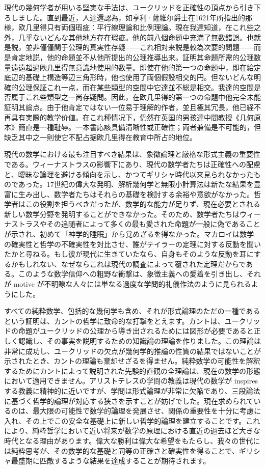 \documentclass[a4paper,11pt,openany]{ltjsbook}
\begin{document}
現代の幾何学者が用いる堅実な手法は、ユークリッドを正確性の頂点から引き下ろしました。直到最近，人達還認為，如亨利·薩維尔爵士在1621年所指出的那様，欧几里得只有両個瑕疵：平行線理論和比例理論。現在我達知道，在これ些之外，几乎ないどんな其他地方存在瑕疵。他的前八個命題中充満了無数錯誤。也就是説，並非僅僅関于公理的真実性存疑——これ相対来説是較為次要的問題——而是肯定地説，他的命題並不从他所提出的公理推導出来。証明其命題所需的公理数量遠遠超過欧几里得無意識地使用的数量。即使在他的第一つの命題中，即在給定底辺的基礎上構造等辺三角形時，他也使用了両個假設相交的円。但ないどんな明確的公理保証これ一点，而在某些類型的空間中它達並不総是相交。我達的空間是否属于これ些類型之一尚存疑問。因此，在欧几里得的第一つの命題中他完全未能証明其論点。由于他肯定ではない一位易于理解的作者，並且極其冗長，他已経不再具有実際的教学价値。在これ種情况下，仍然在英国的男孩達中間教授《几何原本》簡直是一種耻辱。一本書応該具備清晰性或正確性；両者兼備是不可能的，但缺乏其中之一則使它不配占据欧几里得在教育中所占的地位。

現代の数学における最も注目すべき結果は、象徴論理と厳格な形式主義の重要性である。ウィーナストラスの影響下にあり、現代の数学者たちは正確性への配慮と、曖昧な論理を避ける傾向を示し、かつてギリシャ時代以来見られなかったものであった。17世紀の偉大な発明、解析幾何学と無限小計算法は新たな結果を豊富に生み出し、数学者たちはそれらの基礎を検討する余裕や意欲がなかった。哲学者はこの役割を担うべきだったが、数学的な能力が足りず、現在必要とされる新しい数学分野を発明することができなかった。そのため、数学者たちはウィーナストラスやその追随者によって多くの最も愛された命題が一般に偽であることが示され、初めて「神学的睡眠」から覚めざるを得なかった。マカロイは数学の確実性と哲学の不確実性を対比させ、誰がテイラーの定理に対する反動を聞いたかと尋ねる。もし彼が現代に生きていたなら、自身もそのような反動を耳にするかもしれない、なぜならこれは現代の調査によって覆された定理だからである。このような数学信仰への粗野な衝撃は、象徴主義への愛着を引き出し、それが motive が不明瞭な人々には単なる過度な学問的礼儀作法のように見られるようにした。

すべての純粋数学、包括的な幾何学も含め、それが形式論理のただの一種であるという証明は、カントの哲学に致命的な打撃をとえます。カントは、ユークリッドの命題がユークリッドの公理から導き出されるためには図形が必要であると正しく認識し、その事実を説明するための知識論の理論を作りました。この理論は非常に成功し、ユークリッドの欠点が幾何学的推論の性質の結果ではないことが示されたとき、カントの理論も棄却せざるを得ません。純粋数学の可能性を解釈するためにカントによって説明された先験的直観の全理論は、現在の数学の形態において適用できません。アリストテレスの学問の教義は現代の数学が inspires する教義に精神的に近いですが、学問は形式論理が非常に欠陥であり、三段論法に基づく哲学的論理が対応する狭さを示すことが妨げでした。現在求められているのは、最大限の可能性で数学的論理を発展させ、関係の重要性を十分に考慮に入れ、その上でこの安全な基礎上に新しい哲学的論理を建立することです。これにより、純粋哲学において近い将来が数学の原理における直近の過去ほど大きな時代となる理由があります。偉大な勝利は偉大な希望をもたらし、我々の世代には純粋思考が、その数学的な基礎と同等の正確さと確実性を得ることで、ギリシャ最盛期に匹敵するような結果を達成することが期待されます。
\end{document}
